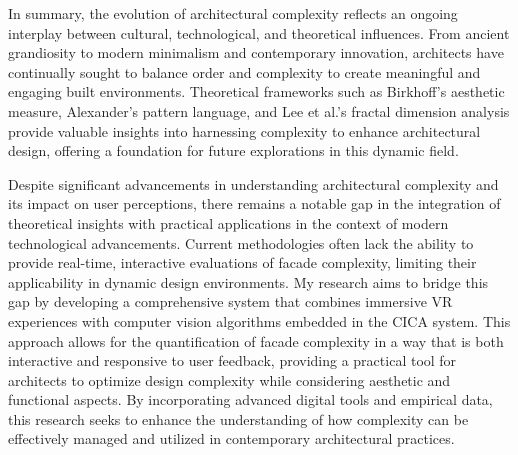 In summary, the evolution of architectural complexity reflects an ongoing interplay between cultural, technological, and theoretical influences.
From ancient grandiosity to modern minimalism and contemporary innovation, architects have continually sought to balance order and complexity to create meaningful and engaging built environments.
Theoretical frameworks such as Birkhoff's aesthetic measure, Alexander's pattern language, and Lee et al.'s fractal dimension analysis provide valuable insights into harnessing complexity to enhance architectural design, offering a foundation for future explorations in this dynamic field.

Despite significant advancements in understanding architectural complexity and its impact on user perceptions, there remains a notable gap in the integration of theoretical insights with practical applications in the context of modern technological advancements.
Current methodologies often lack the ability to provide real-time, interactive evaluations of facade complexity, limiting their applicability in dynamic design environments.
My research aims to bridge this gap by developing a comprehensive system that combines immersive VR experiences with computer vision algorithms embedded in the CICA system.
This approach allows for the quantification of facade complexity in a way that is both interactive and responsive to user feedback, providing a practical tool for architects to optimize design complexity while considering aesthetic and functional aspects.
By incorporating advanced digital tools and empirical data, this research seeks to enhance the understanding of how complexity can be effectively managed and utilized in contemporary architectural practices.

